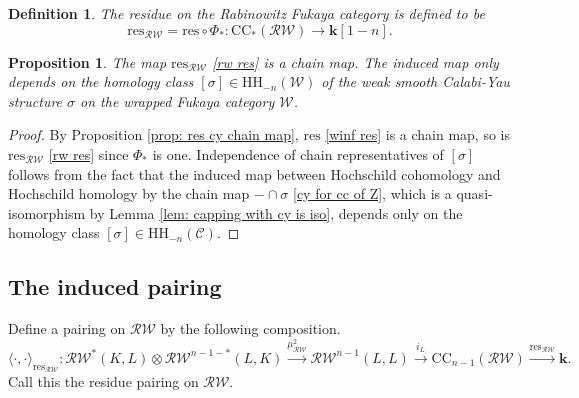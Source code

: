 \documentclass[11pt]{amsproc}
\def\K{{\mathbf{k}}}
\def\w{\mathcal{W}(E)}
\def\cc{\mathcal{C}}
\def\r#1{\mathrm{#1}}
\def\w{\mathcal{W}}
\def\rw{\mathcal{RW}}
\newtheorem{prop}[lem]{Proposition}
\newtheorem{defn}[lem]{Definition}
\theoremstyle{remark}
\numberwithin{equation}{section}
\begin{document}
\begin{defn}\label{defn: rw res}
The residue on the Rabinowitz Fukaya category is defined to be
\begin{equation}\label{rw res}
\r{res}_{\rw} = \r{res} \circ \Phi_{*}: \r{CC}_{*}(\rw) \to \K[1-n].
\end{equation}
\end{defn}

\begin{prop}
The map $\r{res}_{\rw}$ \eqref{rw res} is a chain map. 
The induced map only depends on the homology class $[\sigma] \in \r{HH}_{-n}(\w)$ of the weak smooth Calabi-Yau structure $\sigma$ on the wrapped Fukaya category $\w$.
\end{prop}
\begin{proof}
By Proposition \ref{prop: res cy chain map}, $\r{res}$ \eqref{winf res} is a chain map,
so is $\r{res}_{\rw}$ \eqref{rw res} since $\Phi_{*}$ is one.
Independence of chain representatives of $[\sigma]$ follows from the fact that the induced map between Hochschild cohomology and Hochschild homology by the chain map $-\cap \sigma$ \eqref{cy for cc of Z},
which is a quasi-isomorphism by Lemma \ref{lem: capping with cy is iso},
 depends only on the homology class $[\sigma] \in \r{HH}_{-n}(\cc)$.
\end{proof}


\subsection{The induced pairing}

Define a pairing on $\rw$ by the following composition.
\begin{equation}\label{rw res pair}
\langle \cdot, \cdot \rangle_{\r{res}_{\rw}}: \rw^{*}(K, L) \otimes \rw^{n-1-*}(L, K) \stackrel{\mu^{2}_{\rw}}\to \rw^{n-1}(L, L) \stackrel{i_{L}} \to \r{CC}_{n-1}(\rw) \stackrel{\r{res}_{\rw}}\to \K.
\end{equation}
Call this the residue pairing on $\rw$.
\end{document}
